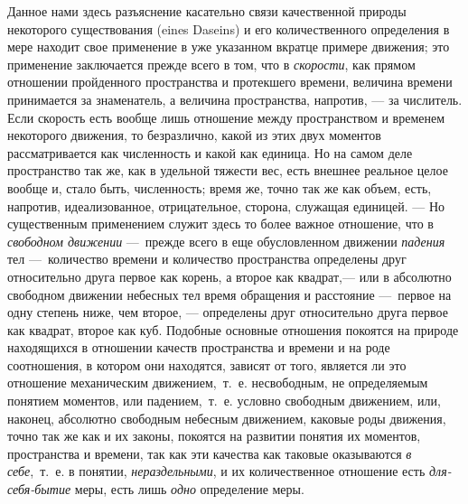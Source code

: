 Данное нами здесь разъяснение касательно связи качественной природы
некоторого существования (eines Daseins) и его количественного определения
в мере находит свое применение в уже указанном вкратце примере движения;
это применение заключается прежде всего в том, что в
{\em скорости}, как прямом отношении пройденного
пространства и протекшего времени, величина времени принимается за
знаменатель, а величина пространства, напротив, — за числитель. Если
скорость есть вообще лишь отношение между пространством и временем
некоторого движения, то безразлично, какой из этих двух моментов
рассматривается как численность и какой как единица. Но на самом деле
пространство так же, как в удельной тяжести вес, есть внешнее реальное
целое вообще и, стало быть, численность; время же, точно так же как объем,
есть, напротив, идеализованное, отрицательное, сторона, служащая единицей.
— Но существенным применением служит здесь то более важное отношение, что в
{\em свободном движении} —~прежде всего в еще
обусловленном движении {\em падения} тел —~количество
времени и количество пространства определены друг относительно друга первое
как корень, а второе как квадрат,— или в абсолютно свободном движении
небесных тел время обращения и расстояние —~первое на одну степень ниже,
чем второе, — определены друг относительно друга первое как квадрат, второе
как куб. Подобные основные отношения покоятся на природе находящихся в
отношении качеств пространства и времени и на роде соотношения, в котором
они находятся, зависят от того, является ли это отношение механическим
движением,~т.~е. несвободным, не определяемым понятием моментов, или
падением,~т.~е. условно свободным движением, или, наконец, абсолютно
свободным небесным движением, каковые роды движения, точно так же как и их
законы, покоятся на развитии понятия их моментов, пространства и времени,
так как эти качества как таковые оказываются {\em в
себе},~т.~е. в понятии, {\em нераздельными}, и их
количественное отношение есть {\em для-себя-бытие}
меры, есть лишь {\em одно} определение меры.

